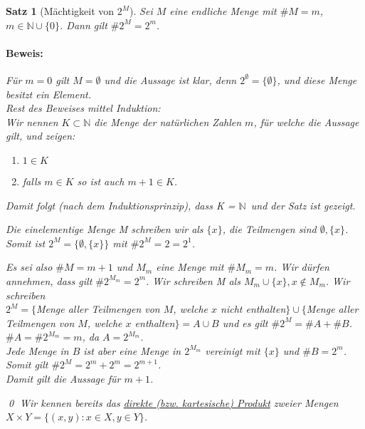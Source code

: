 \documentclass{report}
\newcommand{\N}{\mathbb{N}}
\newcommand{\mN}{\(\mathbb{N}\)}
\theoremstyle{customrem}
\theoremstyle{customdef}
\newtheorem{satz}[definition]{Satz}
\renewenvironment{proof}{\paragraph{Beweis: }}{\qed}
\begin{document}
	\begin{satz}[Mächtigkeit von $2^M$]
		Sei \(M\) eine endliche Menge mit \(\#M = m\), \(m \in \N \cup \{0\}\). Dann gilt \(\#2^M = 2^m\).\\
		\begin{proof}
			Für \(m = 0\) gilt \(M = \emptyset\) und die Aussage ist klar, denn \(2^\emptyset = \{\emptyset\}\), und diese Menge besitzt ein Element.\\
			Rest des Beweises mittel Induktion:\\
			Wir nennen \(K \subset \N\) die Menge der natürlichen Zahlen \(m\), für welche die Aussage gilt, und zeigen:
			\begin{enumerate}
				\itemsep0cm
				\item \(1 \in K\)
				\item falls \(m \in K\) so ist auch \(m + 1 \in K\).
			\end{enumerate}
			Damit folgt (nach dem Induktionsprinzip), dass  K = \mN\ und der Satz ist gezeigt.\\
			\begin{description}[labelindent = 12pt, labelwidth = 1.0cm, leftmargin = 1.0cm]
				\item[Zu 1.:] Die einelementige Menge M schreiben wir als \(\{x\}\), die Teilmengen sind \(\emptyset, \{x\}\). Somit ist \(2^M = \{\emptyset, \{x\}\}\) mit \(\#2^M = 2 = 2^1\).
				\item[Zu 2.:] Es sei also \(\#M = m + 1\)  und \(M_m\) eine Menge mit \(\# M_m = m\). Wir dürfen annehmen, dass gilt \(\#2^{M_m} = 2^m\). Wir schreiben M als \(M_m \cup \{x\}, x \not\in M_m\). Wir schreiben\\
				\(2^M = \{\)Menge aller Teilmengen von \(M\), welche \(x\) nicht enthalten\(\} \cup \{\)Menge aller Teilmengen von \(M\), welche \(x\) enthalten\(\} = A \cup B\) und es gilt \(\#2^M = \#A + \#B\).\\
				\(\#A = \#2^{M_m} = m\), da \(A = 2^{M_m}\).\\
				Jede Menge in \(B\) ist aber eine Menge in \(2^{M_m}\) vereinigt mit \(\{x\}\) und \(\#B = 2^m\). Somit gilt \(\#2^M = 2^m + 2^m = 2^{m + 1}\).\\
				Damit gilt die Aussage für \(m + 1\).
			\end{description}
		\end{proof}
		Wir kennen bereits das \hyperref[defmengenoperationen]{direkte (bzw. kartesische) Produkt} zweier Mengen \(X \times Y = \{(x, y) : x\in X, y \in Y\}\).\\
	\end{satz}
	
\end{document}

